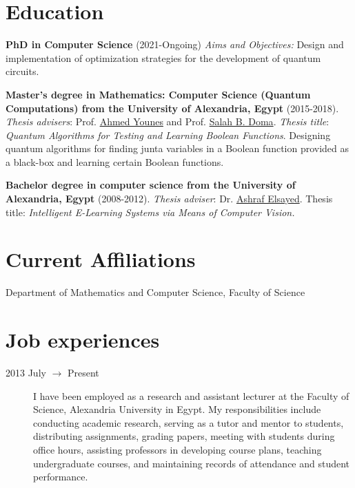 \documentclass[margin,line]{resume}
\begin{document}
\begin{resume}
	\section{\mysidestyle Education}
	\textbf{PhD in Computer Science} (2021-Ongoing)
	\emph{Aims and Objectives:} Design and implementation of optimization strategies for the development of quantum circuits.

	\textbf{Master's degree in Mathematics: Computer Science (Quantum Computations) from the University of Alexandria, Egypt} (2015-2018).
	\emph{Thesis advisers}: Prof.  \href{https://scholar.google.com.eg/citations?user=CZz2XFIAAAAJ&hl=en}{Ahmed Younes} and Prof. \href{https://scholar.google.com.eg/citations?hl=en&user=YFeMsegAAAAJ&view_op=list_works&sortby=pubdate}{Salah B. Doma}.
	\emph{Thesis title}: \textit{Quantum Algorithms for Testing and Learning Boolean Functions}. Designing quantum algorithms for finding junta variables in a Boolean function provided as a black-box and learning certain Boolean functions.

	\textbf{Bachelor degree in computer science from the University of Alexandria, Egypt}
	(2008-2012).  \emph{Thesis adviser}: Dr. \href{https://scholar.google.com.eg/citations?hl=en&user=G9tQkdIAAAAJ&view_op=list_works&sortby=pubdate}{Ashraf Elsayed}.
	Thesis title: \textit{Intelligent E-Learning Systems via Means of Computer Vision.}


	\section{\mysidestyle Current Affiliations}\vspace{1mm}
	\begin{description}
		\item[Department of Mathematics and Computer Science, Faculty of Science]
	\end{description}


	\section{\mysidestyle Job experiences}\vspace{1mm}
	\begin{description}



		\item[2013 July $\rightarrow$ Present]  I have been employed as a research and assistant lecturer at the Faculty of Science, Alexandria University in Egypt. My responsibilities include conducting academic research, serving as a tutor and mentor to students, distributing assignments, grading papers, meeting with students during office hours, assisting professors in developing course plans, teaching undergraduate courses, and maintaining records of attendance and student performance.


\end{description}
\end{resume}
\end{document}

